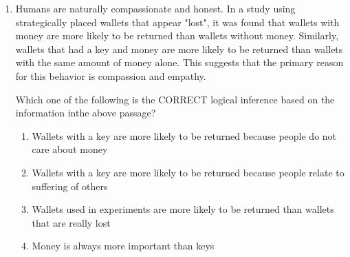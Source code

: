 \documentclass[journal,12pt,onecolumn]{IEEEtran}
\theoremstyle{remark}
\begin{document}
\begin{enumerate}
\begin{enumerate}
\end{enumerate}

\item Humans are naturally compassionate and honest. In a study using strategically placed wallets that appear "lost", it was found that wallets with money are more likely to be returned than wallets without money. Similarly, wallets that had a key and money are more likely to be returned than wallets with the same amount of money alone. This suggests that the primary reason for this behavior is compassion and empathy.  

Which one of the following is the CORRECT logical inference based on the information inthe above passage?

\hfill{}

\begin{enumerate}
\item Wallets with a key are more likely to be returned because people do not care about money
\item Wallets with a key are more likely to be returned because people relate to suffering of others
\item Wallets used in experiments are more likely to be returned than wallets that are really lost
\item Money is always more important than keys
\end{enumerate}


\end{enumerate}
\end{document}
